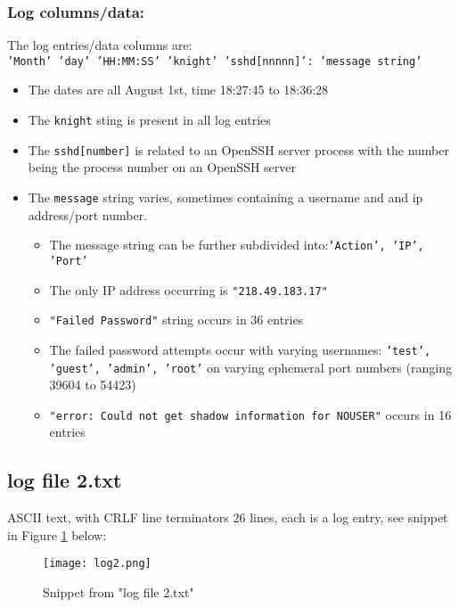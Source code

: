 \documentclass[
	letterpaper, %
	10pt, %
	unnumberedsections, %
	twoside, %
]{APAAssignment}
\begin{document}
\subsubsection{Log columns/data:} The log entries/data columns are: \\
\texttt{'Month' 'day' 'HH:MM:SS' 'knight' 'sshd[nnnnn]': 'message string'}
\begin{itemize}
	\item The dates are all August 1st, time 18:27:45 to 18:36:28
	\item The \texttt{knight} sting is present in all log entries
	\item The \texttt{sshd{[}number{]}} is related to an OpenSSH server process with the number being the process number on an OpenSSH server
	\item The \texttt{message} string varies, sometimes containing a username and and ip address/port number.
	      \begin{itemize}
		      \item The message string can be further subdivided into:\texttt{'Action', 'IP', 'Port'}
		      \item The only IP address occurring is \texttt{"218.49.183.17"}
		      \item \texttt{"Failed Password"} string occurs in 36 entries
		      \item The failed password attempts occur with varying usernames: \texttt{'test', 'guest', 'admin', 'root'} on varying ephemeral port numbers (ranging 39604 to 54423)
		      \item \texttt{"error: Could not get shadow information for NOUSER"} occurs in 16 entries
	      \end{itemize}
\end{itemize}

\subsection{log file 2.txt}\label{log-file-2.txt}
ASCII text, with CRLF line terminators 26 lines, each is a log entry, see snippet in Figure \ref{fig:log2} below: \\
\begin{figure}[!htp] %
	\centering
	\texttt{[image: log2.png]}
	\caption{Snippet from "log file 2.txt"}	\label{fig:log2}
\end{figure}
\end{document}
